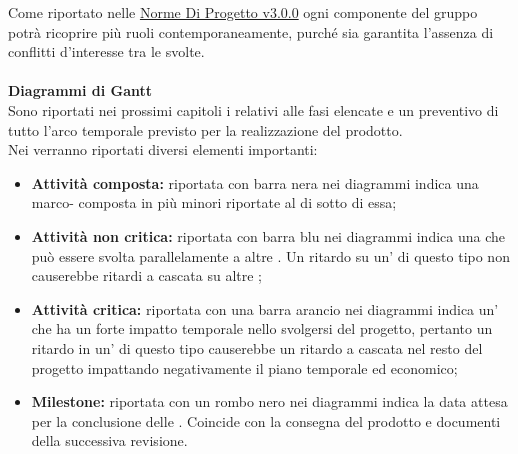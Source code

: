 \documentclass{scalatekids-article}
\begin{document}
Come riportato nelle \href{run:../Interni/NormeDiProgetto\_v3.0.0.pdf}{Norme Di Progetto v3.0.0} ogni componente del gruppo potrà ricoprire più ruoli contemporaneamente, purché sia garantita l'assenza di conflitti d'interesse tra le  svolte.\\ \\
\textbf{Diagrammi di Gantt}\\
Sono riportati nei prossimi capitoli i  relativi alle fasi elencate e un  preventivo di tutto l'arco temporale previsto per la realizzazione del prodotto.\\
Nei  verranno riportati diversi elementi importanti:
\begin{itemize}
\item \textbf{Attività composta:} riportata con barra nera nei diagrammi indica una marco- composta in più  minori riportate al di sotto di essa;
\item \textbf{Attività non critica:} riportata con barra blu nei diagrammi indica una  che può essere svolta parallelamente a altre . Un ritardo su un' di questo tipo non causerebbe ritardi a cascata su altre ;
\item \textbf{Attività critica:} riportata con una barra arancio nei diagrammi indica un' che ha un forte impatto temporale nello svolgersi del progetto, pertanto un ritardo in un' di questo tipo causerebbe un ritardo a cascata nel resto del progetto impattando negativamente il piano temporale ed economico;
\item \textbf{Milestone:} riportata con un rombo nero nei diagrammi indica la data attesa per la conclusione delle . Coincide con la consegna del prodotto e documenti della successiva revisione.
\end{itemize}
\end{document}
